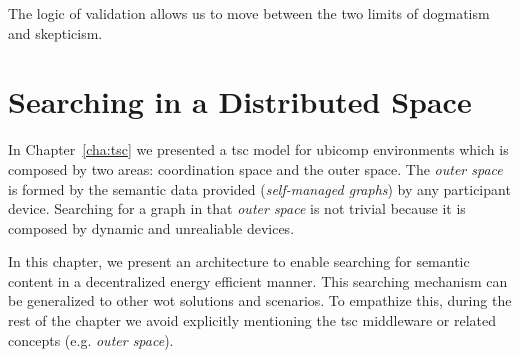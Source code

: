 

\begin{savequote}[50mm]
The logic of validation allows us to move between the two limits of dogmatism and skepticism. 
\end{savequote}


\chapter{Searching in a Distributed Space}
\label{cha:searching}
\newcommand{\pathchapfour}{4_search}


\newcommand{\Space}{\emph{Space}} %
\newcommand{\Spaces}{\emph{Spaces}} %
\newcommand{\consumer}{\emph{Consumer}}
\newcommand{\consumers}{\emph{Consumers}}
\newcommand{\provider}{\emph{Provider}}
\newcommand{\providers}{\emph{Providers}}
\newcommand{\clue}{\emph{clue}}
\newcommand{\clues}{\emph{clues}}


\ifpdf
    \graphicspath{{\pathchapfour/figures/PNG/}{\pathchapfour/figures/PDF/}{\pathchapfour/figures/}}
\else
    \graphicspath{{\pathchapfour/figures/EPS/}{\pathchapfour/figures/}}
\fi



In Chapter~\ref{cha:tsc} we presented a \ac{tsc} model for \ac{ubicomp} environments which is composed by two areas: coordination space and the outer space.
The \emph{outer space} is formed by the semantic data provided (\emph{self-managed graphs}) by any participant device.
Searching for a graph in that \emph{outer space} is not trivial because it is composed by dynamic and unrealiable devices.

In this chapter, we present an architecture to enable searching for semantic content in a decentralized energy efficient manner.
This searching mechanism can be generalized to other \ac{wot} solutions and scenarios.
To empathize this, during the rest of the chapter we avoid explicitly mentioning the \ac{tsc} middleware or related concepts (e.g. \emph{outer space}).












